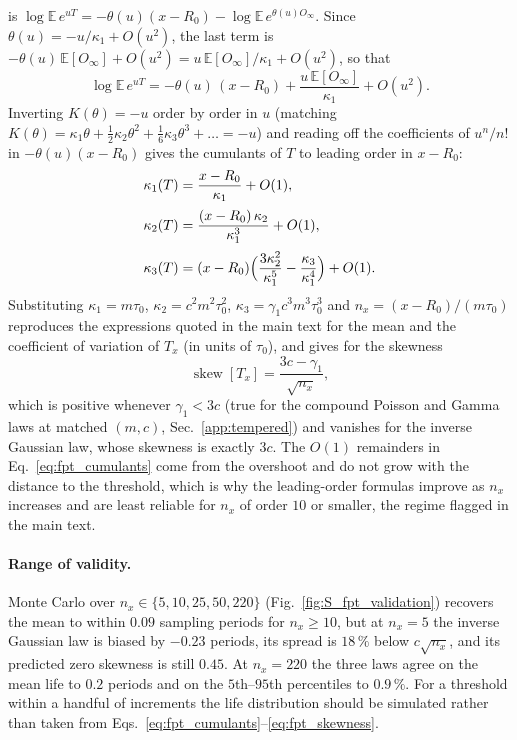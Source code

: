 \documentclass[preprint,12pt]{elsarticle}
\begin{document}
is $\log\mathbb E\,e^{uT}=-\theta(u)(x-R_0)-\log\mathbb E\,e^{\theta(u)O_\infty}$.
Since $\theta(u)=-u/\kappa_1+O(u^2)$, the last term is
$-\theta(u)\,\mathbb E[O_\infty]+O(u^2)=u\,\mathbb E[O_\infty]/\kappa_1+O(u^2)$,
so that
\begin{equation}
  \log\mathbb E\,e^{uT}
  =-\theta(u)\,(x-R_0)+\frac{u\,\mathbb E[O_\infty]}{\kappa_1}+O(u^2).
  \label{eq:cgf_fpt}
\end{equation}
Inverting $K(\theta)=-u$ order by order in $u$ (matching
$K(\theta)=\kappa_1\theta+\tfrac12\kappa_2\theta^2+\tfrac16\kappa_3\theta^3+\dots=-u$)
and reading off the coefficients of $u^n/n!$ in
$-\theta(u)(x-R_0)$ gives the cumulants of $T$ to leading order in
$x-R_0$:
\begin{equation}
\begin{aligned}
  \kappa_1(T)&=\frac{x-R_0}{\kappa_1}+O(1),\\[2pt]
  \kappa_2(T)&=\frac{(x-R_0)\,\kappa_2}{\kappa_1^3}+O(1),\\[2pt]
  \kappa_3(T)&=(x-R_0)\Bigl(\frac{3\kappa_2^2}{\kappa_1^5}
              -\frac{\kappa_3}{\kappa_1^4}\Bigr)+O(1).
\end{aligned}
\label{eq:fpt_cumulants}
\end{equation}
Substituting $\kappa_1=m\tau_0$, $\kappa_2=c^2m^2\tau_0^2$,
$\kappa_3=\gamma_1c^3m^3\tau_0^3$ and $n_x=(x-R_0)/(m\tau_0)$ reproduces the
expressions quoted in the main text for the mean and the coefficient of
variation of $T_x$ (in units of $\tau_0$),
and gives for the skewness
\begin{equation}
  \operatorname{skew}[T_x]=\frac{3c-\gamma_1}{\sqrt{n_x}},
  \label{eq:fpt_skewness}
\end{equation}
which is positive whenever $\gamma_1<3c$ (true for the compound Poisson and
Gamma laws at matched $(m,c)$, Sec.~\ref{app:tempered}) and vanishes for
the inverse Gaussian law, whose skewness is exactly $3c$. The $O(1)$
remainders in Eq.~\eqref{eq:fpt_cumulants} come from the overshoot and do
not grow with the distance to the threshold, which is why the leading-order
formulas improve as $n_x$ increases and are least reliable for $n_x$ of
order $10$ or smaller, the regime flagged in the main text.

\paragraph*{Range of validity.} Monte Carlo over $n_x\in\{5,10,25,50,220\}$
(Fig.~\ref{fig:S_fpt_validation}) recovers the mean to within $0.09$ sampling
periods for $n_x\ge10$, but at $n_x=5$ the inverse Gaussian law is biased by
$-0.23$ periods, its spread is $18\,\%$ below $c\sqrt{n_x}$, and its
predicted zero skewness is still $0.45$. At $n_x=220$ the three laws agree
on the mean life to $0.2$ periods and on the $5$th--$95$th percentiles to
$0.9\,\%$. For a threshold within a handful of
increments the life distribution should be simulated rather than taken from
Eqs.~\eqref{eq:fpt_cumulants}--\eqref{eq:fpt_skewness}.





\end{document}
